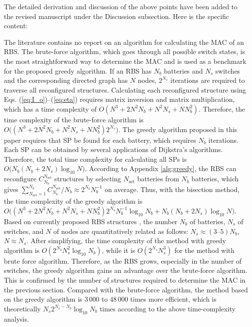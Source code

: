 \begin{revresponse}
The detailed derivation and discussion of the above points have been added to the revised manuscript under the Discussion subsection.
Here is the specific content:
\begin{changes}
The literature contains no report on an algorithm for calculating the MAC of an RBS.
The brute-force algorithm, which goes through all possible switch states, is the most straightforward way to determine the MAC and is used as a benchmark for the proposed greedy algorithm.
If an RBS has $N_b$ batteries and $N_s$ switches and the corresponding directed graph has $N$ nodes,  $2^{N_s}$ iterations are required to traverse all reconfigured structures.
Calculating each reconfigured structure using Eqs. (\ref{eq:I_o})--(\ref{eq:eta}) requires matrix inversion and matrix multiplication, which has a time complexity of $O(N^3+2N^2N_b+N^2N_s+NN^2_b)$.
Therefore, the time complexity of the brute-force algorithm is $O\bm((N^3+2N^2N_b+N^2N_s+NN^2_b)2^{N_s}\bm)$.
The greedy algorithm proposed in this paper requires  that SP be found for each battery, which requires $N_b$ iterations.
Each SP can be obtained by several applications of Dijkstra's algorithms.
Therefore, the total time complexity for calculating all SPs is $O\bm(N_b(N_b+2N_s)\log_{10} N\bm)$.
According to  Appendix \ref{alg:greedy}, the RBS can reconfigure $C^{N_{\text{set}}}_{N_b}$ structures by selecting $N_{\text{set}}$ batteries from $N_b$ batteries, which gives $\sum^{N_b}_{N_{\text{set}}=1}C^{N_{\text{set}}}_{N_b}/N_b \approx 2^{N_b} N_b^{-1}$ on average.
Thus, with the bisection method, the time complexity of the greedy algorithm is $O\bm((N^3+2N^2N_b+N^2N_s+NN^2_b) 2^{N_b} N_b^{-1} \log_{10} N_b+N_b(N_b+2N_s)\log_{10} N\bm)$.
Based on currently proposed RBS structures \cite{ciNovelDesignAdaptive2007,alahmadBatterySwitchArray2008,kimDependableEfficientScalable2010b,kimBalancedReconfigurationStorage2011a,taesickimSeriesconnectedSelfreconfigurableMulticell2012a,6843711}, the number $N_b$ of batteries, $N_s$ of switches, and $N$ of nodes are quantitatively related as follows: $N_s \approx (3\text{--} 5)N_b$, $N \approx N_s$. 
After simplifying, the time complexity of the method with greedy algorithm is $O(2^{N_b}N_s^2\log_{10} N_b)$, while it is $O(2^{N_s}N_s^3)$ for the method with brute force algorithm.
Therefore, as the RBS grows, especially in the number of switches, the greedy algorithm gains an advantage over the brute-force algorithm.
This is confirmed by the number of structures required to determine the MAC in the previous section. 
Compared with the brute-force algorithm, the method based on the greedy algorithm is 3\,000 to 48\,000 times more efficient, which is theoretically $N_s 2^{N_s - N_b} \log_{10} N_b$ times according to the above time-complexity analysis.

\end{changes}
\end{revresponse}
